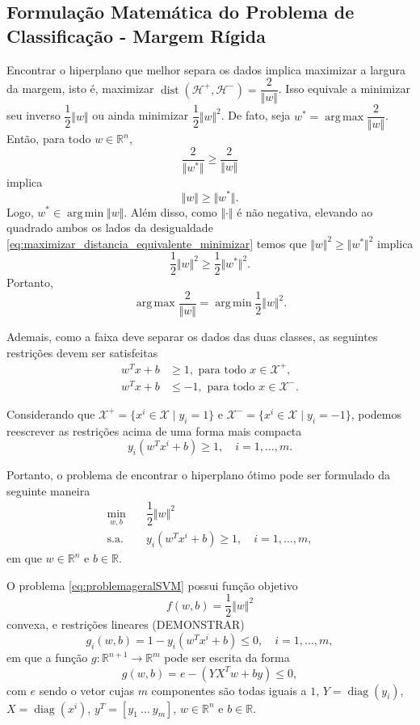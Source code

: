 \documentclass[12pt,a4paper]{scrartcl}
\DeclareMathOperator*{\argmax}{arg\, max}
\DeclareMathOperator*{\argmin}{arg\, min}
\DeclareMathOperator{\diag}{diag}
\DeclareMathOperator{\dist}{dist}
\def\Xset{\mathcal{X}}
\def\Hset{\mathcal{H}}
\def\RR{\mathds{R}}
\theoremstyle{definition}%
\begin{document}
\subsection{Formulação Matemática do Problema de Classificação - Margem Rígida}

Encontrar o hiperplano que melhor separa os dados implica maximizar a largura da margem, isto é, maximizar $\dist(\Hset^{+} , \Hset^{-}) =\dfrac{2}{\Vert w\Vert }$. Isso equivale a minimizar seu inverso $\dfrac{1}{2}\Vert w\Vert $ ou ainda minimizar $\dfrac{1}{2}\Vert w\Vert^{2}$. De fato, seja $w^{*}=\argmax\dfrac{2}{\Vert w\Vert}$. Então, para todo $w\in \RR^n$,
\[ 
\dfrac{2}{\Vert w^{*}\Vert} \geq \dfrac{2}{\Vert w\Vert} 
\]
implica
\[ \label{eq:maximizar_distancia_equivalente_minimizar} 
\Vert w\Vert \geq \Vert w^{*}\Vert. 
\]
Logo, $w^{*} \in \argmin\Vert w\Vert$. Além disso, como $\Vert \cdot \Vert$ é não negativa, elevando ao quadrado ambos os lados da desigualdade \eqref{eq:maximizar_distancia_equivalente_minimizar} temos que  $\Vert w\Vert^{2} \geq \Vert w^{*}\Vert^{2}$ implica
\[ 
\dfrac{1}{2}\Vert w\Vert^{2} \geq \dfrac{1}{2}\Vert w^{*}\Vert^{2}. 
\]
Portanto, 
\[ \argmax\dfrac{2}{\Vert w\Vert} = \argmin\dfrac{1}{2}\Vert w\Vert^2. \]

Ademais, como a faixa deve separar os dados das duas classes, as seguintes restrições devem ser satisfeitas
\begin{align}
w^{T}x+b &\geq 1 , \text{ para  todo } x\in \Xset^{+}, \\
w^{T}x+b &\leq -1 , \text{ para  todo } x\in \Xset^{-}.
\end{align}

Considerando que $\Xset^{+}=\{x^i \in \Xset\mid y_i=1\}$ e $\Xset^{-}=\{x^i \in \Xset \mid y_i=-1\}$, podemos reescrever as restrições acima de uma forma mais compacta 
\[ y_{i}(w^{T}x^{i}+b)\geq 1, \quad i=1, \ldots ,m. \]

Portanto, o problema de encontrar o hiperplano ótimo pode ser formulado da seguinte maneira
\[ \label{eq:problemageralSVM}
\begin{aligned}
\min_{w,b} & \quad \dfrac{1}{2} \Vert w\Vert^{2} \\
\text{s.a.} &  \quad y_i(w^{T}x^{i}+b) \geq 1, \quad i=1, \ldots , m, \end{aligned}
 \]
em que $w\in \RR^{n}$ e $b\in \RR$. 

O problema \eqref{eq:problemageralSVM} possui função objetivo 
\[ f(w,b)=\dfrac{1}{2}\Vert w\Vert^{2} \]
convexa, e restrições lineares (DEMONSTRAR)
\[ g_i(w,b)=1-y_i(w^{T}x^{i}+b) \leq 0, \quad i=1, \ldots, m, \]
em que a função $g:\RR^{n+1} \rightarrow \RR^{m}$ pode ser escrita da forma 
\[ g(w,b)= e - (YX^{T}w+by) \leq 0, \]
com $e$ sendo o vetor cujas $m$ componentes são todas iguais a $1$, $Y=\diag(y_{i})$, $X=\diag(x^{i})$, $y^{T}=[y_{1} \ \ldots \ y_{m}]$, $w\in \RR^n$ e $b\in \RR$.
\end{document}
